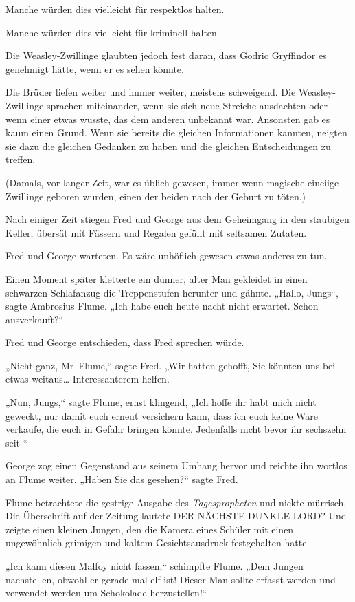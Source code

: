 {Manche würden dies vielleicht für respektlos halten.

Manche würden dies vielleicht für kriminell halten.

Die Weasley-Zwillinge glaubten jedoch fest daran, dass Godric Gryffindor es genehmigt hätte, wenn er es sehen könnte.

Die Brüder liefen weiter und immer weiter, meistens schweigend. Die Weasley-Zwillinge sprachen miteinander, wenn sie sich neue Streiche ausdachten oder wenn einer etwas wusste, das dem anderen unbekannt war. Ansonsten gab es kaum einen Grund. Wenn sie bereits die gleichen Informationen kannten, neigten sie dazu die gleichen Gedanken zu haben und die gleichen Entscheidungen zu treffen.

(Damals, vor langer Zeit, war es üblich gewesen, immer wenn magische eineiige Zwillinge geboren wurden, einen der beiden nach der Geburt zu töten.)

Nach einiger Zeit stiegen Fred und George aus dem Geheimgang in den staubigen Keller, übersät mit Fässern und Regalen gefüllt mit seltsamen Zutaten.

Fred und George warteten. Es wäre unhöflich gewesen etwas anderes zu tun.

Einen Moment später kletterte ein dünner, alter Man gekleidet in einen schwarzen Schlafanzug die Treppenstufen herunter und gähnte. „Hallo, Jungs“, sagte Ambrosius Flume. „Ich habe euch heute nacht nicht erwartet. Schon ausverkauft?“

Fred und George entschieden, dass Fred sprechen würde.

„Nicht ganz, Mr~Flume,“ sagte Fred. „Wir hatten gehofft, Sie könnten uns bei etwas weitaus… Interessanterem helfen.

„Nun, Jungs,“ sagte Flume, ernst klingend, „Ich hoffe ihr habt mich nicht geweckt, nur damit euch erneut versichern kann, dass ich euch keine Ware verkaufe, die euch in Gefahr bringen könnte. Jedenfalls nicht bevor ihr sechszehn seit \later“

George zog einen Gegenstand aus seinem Umhang hervor und reichte ihn wortlos an Flume weiter. „Haben Sie das gesehen?“ sagte Fred.

Flume betrachtete die gestrige Ausgabe des \emph{Tagespropheten} und nickte mürrisch. Die Überschrift auf der Zeitung lautete DER NÄCHSTE DUNKLE LORD? Und zeigte einen kleinen Jungen, den die Kamera eines Schüler mit einen ungewöhnlich grimigen und kaltem Gesichtsausdruck festgehalten hatte.

„Ich kann diesen Malfoy nicht fassen,“ schimpfte Flume. „Dem Jungen nachstellen, obwohl er gerade mal elf ist! Dieser Man sollte erfasst werden und verwendet werden um Schokolade herzustellen!“

}
